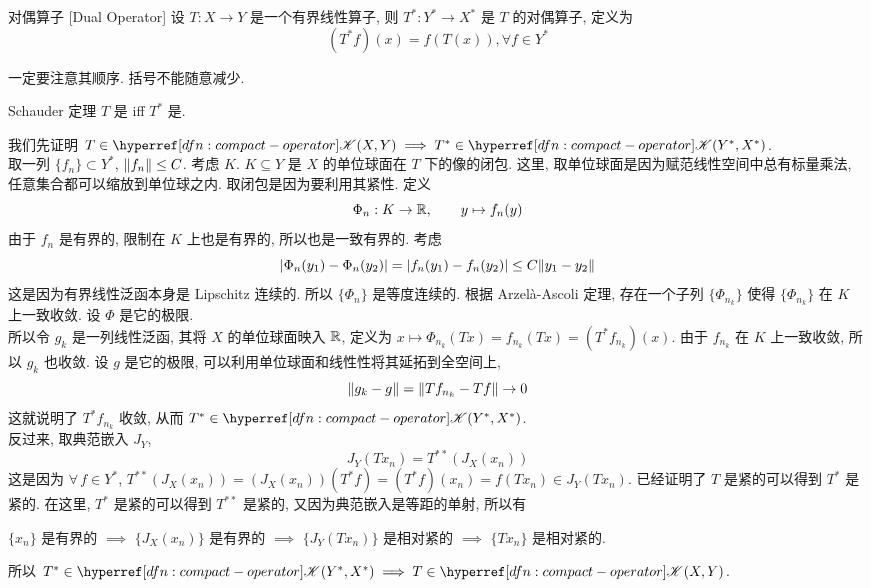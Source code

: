         \begin{dfn}
            {对偶算子}
            [Dual Operator]
            设 $T: X \to Y$ 是一个有界线性算子, 则 $T^*: Y^* \to X^*$ 是 $T$ 的对偶算子, 定义为
            \[ (T^* f) (x) = f (T(x)), \forall f \in Y^* \]
        \end{dfn}

        \begin{rmk}
            [Dedicatia]
            一定要注意其顺序. 括号不能随意减少.
        \end{rmk}

        \begin{thm}
            [schauder]
            {Schauder 定理}
            $T$ 是\CompactOp{} iff $T^*$ 是\CompactOp{}.
        \end{thm}

        \begin{prf}
            我们先证明 \(T\in\cpt(X,Y)\implies T^*\in\cpt(Y^*,X^*)\).\\
            取一列 \(\{f_n\}\subset Y^*\), \(\norm{f_n}\leq C\). 考虑 \(K\). \(K\subseteq Y\) 是 \(X\) 的单位球面在 \(T\) 下的像的闭包. 这里, 取单位球面是因为赋范线性空间中总有标量乘法, 任意集合都可以缩放到单位球之内. 取闭包是因为要利用其紧性. 定义
            \[\Phi_n: K\to\operatorname{\mathbb{R}},\qquad y\mapsto f_n (y) \]
            由于 \(f_n\) 是有界的, 限制在 \(K\) 上也是有界的, 所以也是一致有界的. 考虑
            \[\abs{\Phi_n(y_1)-\Phi_n(y_2)}=\abs{f_n(y_1)-f_n(y_2)}\leq C\norm{y_1-y_2}\]
            这是因为有界线性泛函本身是 Lipschitz 连续的. 所以 \(\{\Phi_n\}\) 是等度连续的. 根据 Arzelà-Ascoli 定理, 存在一个子列 \(\{\Phi_{n_k}\}\) 使得 \(\{\Phi_{n_k}\}\) 在 \(K\) 上一致收敛. 设 \(\Phi\) 是它的极限. \\
            所以令 \(g_k\) 是一列线性泛函, 其将 \(X\) 的单位球面映入 \(\operatorname{\mathbb{R}}\), 定义为 \(x\mapsto \Phi_{n_k} (Tx)=f_{n_k} (Tx)=(T^* f_{n_k}) (x) \). 由于 \(f_{n_k}\) 在 \(K\) 上一致收敛, 所以 \(g_k\) 也收敛. 设 \(g\) 是它的极限, 可以利用单位球面和线性性将其延拓到全空间上, 
            \[\norm{g_k-g}=\norm{T f_{n_k}-T f}\to 0\]
            这就说明了 \(T^* f_{n_k}\) 收敛, 从而 \(T^*\in\cpt(Y^*,X^*)\).\\
            反过来, 取典范嵌入 \(J_Y\), 
            \[J_Y (Tx_n) = T^{**} (J_X (x_n))\]
            这是因为 \(\forall\,f\in Y^*\), \(T^{**} (J_X (x_n))=(J_X (x_n)) (T^* f)=(T^* f) (x_n) = f(Tx_n) \in J_Y(Tx_n)\).
            已经证明了 \(T\) 是紧的可以得到 \(T^*\) 是紧的. 在这里, \(T^*\) 是紧的可以得到 \(T^{**}\) 是紧的, 又因为典范嵌入是等距的单射, 所以有
            \begin{center}
                \(\{x_n\}\) 是有界的 \(\implies\) \(\{J_X(x_n)\}\) 是有界的 \(\implies\) \(\{J_Y (Tx_n)\}\) 是相对紧的 \(\implies\) \(\{Tx_n\}\) 是相对紧的.
            \end{center}
            所以 \(T^*\in \cpt(Y^*,X^*)\implies T\in\cpt(X,Y)\).
        \end{prf}

